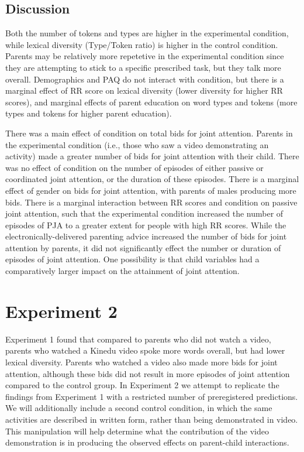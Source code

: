 \documentclass[10pt, letterpaper]{article}
\begin{document}
\subsection{Discussion}\label{discussion}

Both the number of tokens and types are higher in the experimental
condition, while lexical diversity (Type/Token ratio) is higher in the
control condition. Parents may be relatively more repetetive in the
experimental condition since they are attempting to stick to a specific
prescribed task, but they talk more overall. Demographics and PAQ do not
interact with condition, but there is a marginal effect of RR score on
lexical diversity (lower diversity for higher RR scores), and marginal
effects of parent education on word types and tokens (more types and
tokens for higher parent education).

There was a main effect of condition on total bids for joint attention.
Parents in the experimental condition (i.e., those who saw a video
demonstrating an activity) made a greater number of bids for joint
attention with their child. There was no effect of condition on the
number of episodes of either passive or coordinated joint attention, or
the duration of these episodes. There is a marginal effect of gender on
bids for joint attention, with parents of males producing more bids.
There is a marginal interaction between RR scores and condition on
passive joint attention, such that the experimental condition increased
the number of episodes of PJA to a greater extent for people with high
RR scores. While the electronically-delivered parenting advice increased
the number of bids for joint attention by parents, it did not
significantly effect the number or duration of episodes of joint
attention. One possibility is that child variables had a comparatively
larger impact on the attainment of joint attention.

\section{Experiment 2}\label{experiment-2}

Experiment 1 found that compared to parents who did not watch a video,
parents who watched a Kinedu video spoke more words overall, but had
lower lexical diversity. Parents who watched a video also made more bids
for joint attention, although these bids did not result in more episodes
of joint attention compared to the control group. In Experiment 2 we
attempt to replicate the findings from Experiment 1 with a restricted
number of preregistered predictions. We will additionally include a
second control condition, in which the same activities are described in
written form, rather than being demonstrated in video. This manipulation
will help determine what the contribution of the video demonstration is
in producing the observed effects on parent-child interactions.
\end{document}
